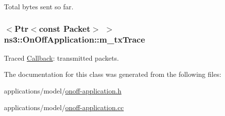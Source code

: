 Total bytes sent so far. 

\subsubsection[{\texorpdfstring{m\+\_\+tx\+Trace}{m_txTrace}}]{$<${\bf Ptr}$<$const {\bf Packet}$>$ $>$ ns3\+::\+On\+Off\+Application\+::m\+\_\+tx\+Trace\hspace{0.3cm}{\ttfamily [private]}}\hypertarget{classns3_1_1OnOffApplication_a29186c3fee6f7ae08fe95fe0638ab307}{}\label{classns3_1_1OnOffApplication_a29186c3fee6f7ae08fe95fe0638ab307}


Traced \hyperlink{classns3_1_1Callback}{Callback}\+: transmitted packets. 



The documentation for this class was generated from the following files\+:\begin{DoxyCompactItemize}
\item 
applications/model/\hyperlink{onoff-application_8h}{onoff-\/application.\+h}\item 
applications/model/\hyperlink{onoff-application_8cc}{onoff-\/application.\+cc}\end{DoxyCompactItemize}
